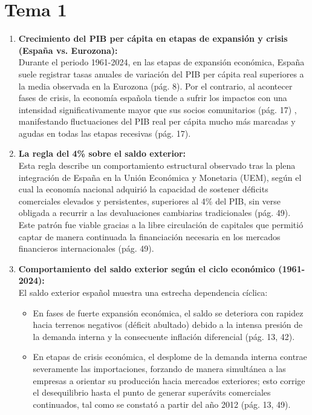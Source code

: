\section{Tema 1}
\begin{enumerate}[label=\arabic*.]

    \item \textbf{Crecimiento del PIB per cápita en etapas de expansión y crisis (España vs. Eurozona):} \\
    Durante el periodo 1961-2024, en las etapas de expansión económica, España suele registrar tasas anuales de variación del PIB per cápita real superiores a la media observada en la Eurozona (pág. 8). Por el contrario, al acontecer fases de crisis, la economía española tiende a sufrir los impactos con una intensidad significativamente mayor que sus socios comunitarios (pág. 17) , manifestando fluctuaciones del PIB real per cápita mucho más marcadas y agudas en todas las etapas recesivas (pág. 17).

    \item \textbf{La regla del 4\% sobre el saldo exterior:} \\
    Esta regla describe un comportamiento estructural observado tras la plena integración de España en la Unión Económica y Monetaria (UEM), según el cual la economía nacional adquirió la capacidad de sostener déficits comerciales elevados y persistentes, superiores al 4\% del PIB, sin verse obligada a recurrir a las devaluaciones cambiarias tradicionales (pág. 49). Este patrón fue viable gracias a la libre circulación de capitales que permitió captar de manera continuada la financiación necesaria en los mercados financieros internacionales (pág. 49).

    \item \textbf{Comportamiento del saldo exterior según el ciclo económico (1961-2024):} \\
    El saldo exterior español muestra una estrecha dependencia cíclica:
    \begin{itemize}
        \item En fases de fuerte expansión económica, el saldo se deteriora con rapidez hacia terrenos negativos (déficit abultado) debido a la intensa presión de la demanda interna y la consecuente inflación diferencial (pág. 13, 42).
        \item En etapas de crisis económica, el desplome de la demanda interna contrae severamente las importaciones, forzando de manera simultánea a las empresas a orientar su producción hacia mercados exteriores; esto corrige el desequilibrio hasta el punto de generar superávits comerciales continuados, tal como se constató a partir del año 2012 (pág. 13, 49).
    \end{itemize}


\end{enumerate}
